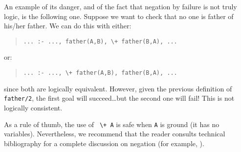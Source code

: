 An example of its danger, and of the fact that negation by failure is
not truly logic, is the following one. Suppose we want to check that
no one is father of his/her father. We can do this with either:
\begin{quote}
\begin{verbatim}
... :- ..., father(A,B), \+ father(B,A), ...
\end{verbatim}
\end{quote}
%
or:
\begin{quote}
\begin{verbatim}
... :- ..., \+ father(A,B), father(B,A), ...
\end{verbatim}
\end{quote}
%
since both are logically equivalent. However, given the previous
definition of \verb+father/2+, the first goal will succeed\ldots but
the second one will fail! This is not logically consistent.

As a rule of thumb, the use of \verb- \+ A- is safe when \verb+A+ is
ground (it has no variables). Nevertheless, we recommend that the
reader consults technical bibliography for a complete discussion on
negation (for example, \cite{SterlingShapiro94}).  

